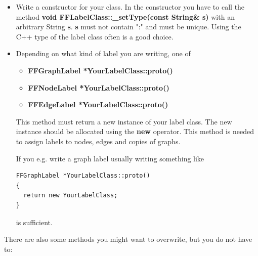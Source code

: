 \begin{itemize}
  
\item Write a constructor for your class. In the constructor you
  have to call the method {\bf void FFLabelClass::\_setType(const
    String\& s)} with an arbitrary String {\bf s}. {\bf s} must
  not contain ":" and must be unique. Using the C++ type of the
  label class often is a good choice.

\item Depending on what kind of label you are writing, one of 

\begin{itemize}

\item{\bf FFGraphLabel *YourLabelClass::proto()}

\item{\bf FFNodeLabel *YourLabelClass::proto()}

\item{\bf FFEdgeLabel *YourLabelClass::proto()}

\end{itemize}

This method must return a new instance of your label class. The
new instance should be allocated using the {\bf new} operator. This
method is needed to assign labels to nodes, edges and copies of
graphs.

If you e.g. write a graph label usually writing something like

\bigskip

\begin{verbatim}
FFGraphLabel *YourLabelClass::proto()
{
  return new YourLabelClass;
}
\end{verbatim}

\bigskip

is sufficient. 

\end{itemize}

There are also some methods you might want to overwrite, but you
do not have to:

